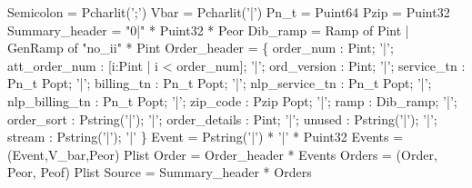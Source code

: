 \begin{code}\scriptsize
{} Semicolon = Pcharlit(';')
 Vbar = Pcharlit('|')
\mbox{}
 Pn\_t = Puint64
 Pzip = Puint32
\mbox{}
 Summary\_header = "0|" * Puint32 * Peor
\mbox{}
 Dib\_ramp = 
  Ramp of Pint 
| GenRamp of "no\_ii" * Pint
\mbox{}
 Order\_header = \{ 
    order\_num : Pint;  
'|'; att\_order\_num : [i:Pint | i < order\_num];  
'|'; ord\_version : Pint;  
'|'; service\_tn : Pn\_t Popt;
'|'; billing\_tn : Pn\_t Popt;  
'|'; nlp\_service\_tn : Pn\_t Popt;  
'|'; nlp\_billing\_tn : Pn\_t Popt;  
'|'; zip\_code : Pzip Popt;  
'|'; ramp : Dib\_ramp;  
'|'; order\_sort : Pstring('|');  
'|'; order\_details : Pint;
'|'; unused : Pstring('|');  
'|'; stream : Pstring('|'); 
'|'
\} 
\mbox{}
 Event  = Pstring('|') * '|' * Puint32
 Events = (Event,V_bar,Peor) Plist
\mbox{}
 Order  = Order\_header * Events
 Orders = (Order, Peor, Peof) Plist
\mbox{}
 Source = Summary\_header * Orders\end{code}
